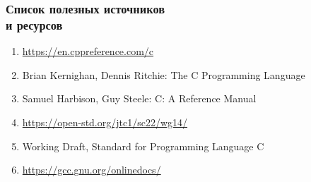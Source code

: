 \documentclass[compress, 8pt, aspectratio=169]{beamer}
\begin{document}
\begin{frame}

    \frametitle{Список полезных источников \\ и ресурсов}

    \begin{enumerate}

        \item \url{https://en.cppreference.com/c}

        \item Brian Kernighan, Dennis Ritchie: The C Programming Language

        \item Samuel Harbison, Guy Steele: C: A Reference Manual

        \item \url{https://open-std.org/jtc1/sc22/wg14/}

        \item Working Draft, Standard for Programming Language C

        \item \url{https://gcc.gnu.org/onlinedocs/}

    \end{enumerate}

\end{frame}
\end{document}
